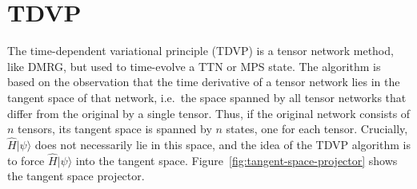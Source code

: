 \section{TDVP}
The time-dependent variational principle (TDVP) is a tensor network method, like DMRG,
but used to time-evolve a TTN or MPS state. The algorithm is based on the observation
that the time derivative of a tensor network lies in the tangent space of that network,
i.e.\ the space spanned by all tensor networks that differ from the original by a single
tensor. Thus, if the original network consists of $n$ tensors, its tangent space is
spanned by $n$ states, one for each tensor. Crucially, $\hat H |\psi\rangle$ does not
necessarily lie in this space, and the idea of the TDVP algorithm is to force
$\hat H |\psi\rangle$ into the tangent space. Figure~\ref{fig:tangent-space-projector}
shows the tangent space projector.

